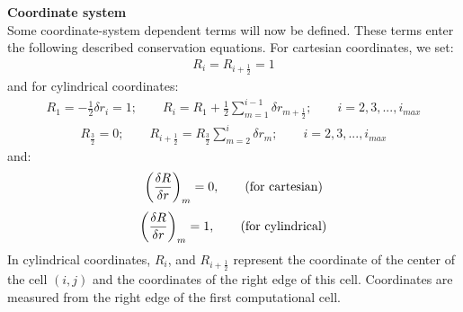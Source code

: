 %
{\bf Coordinate system}\\
Some coordinate-system dependent terms will now be defined.
These terms enter the following described conservation equations.
For cartesian coordinates, we set:
%
\begin{eqnarray}
R_{i} =  R_{i+\frac{1}{2}} = 1
\nonumber
\end{eqnarray}
%
and for cylindrical coordinates:
%
\begin{eqnarray}
R_{1} =  -\frac{1}{2} \delta r_{i} = 1;
\qquad R_{i} =  R_{1}+\frac{1}{2} \sum_{m=1}^{i-1}
\delta r_{m+\frac{1}{2}};\qquad i=2,3,...,i_{max}
\nonumber
\end{eqnarray}
%
\begin{eqnarray}
R_{\frac{3}{2}} =  0; \qquad R_{i+\frac{1}{2}} =  R_{\frac{3}{2}} \sum_{m=2}^{i}
\delta r_{m}; \qquad i = 2,3,...,i_{max}
\nonumber
\end{eqnarray}
%
and:
%
\begin{eqnarray}
\bigg(\frac{\delta R}{\delta r}\bigg)_m  =  0, \qquad \mbox{\rm (for cartesian)}
\nonumber
\end{eqnarray}
%
\begin{eqnarray}
\bigg(\frac{\delta R}{\delta r}\bigg)_m  =  1, \qquad \mbox{\rm (for cylindrical)}
\nonumber
\end{eqnarray}
%
In cylindrical coordinates, $R_{i}$, and $R_{i+\frac{1}{2}}$ represent the coordinate
of the center of the cell $(i,j)$ and the coordinates of the right edge of this cell.
Coordinates are measured from the right edge of the first computational cell.\\

\clearpage
